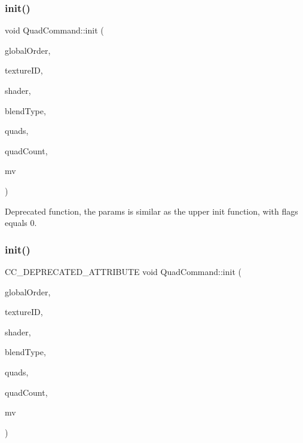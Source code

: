 \subsubsection{\texorpdfstring{init()}{init()}\hspace{0.1cm}{\footnotesize\ttfamily [3/4]}}
{\footnotesize\ttfamily void Quad\+Command\+::init (\begin{DoxyParamCaption}\item[{float}]{global\+Order,  }\item[{G\+Luint}]{texture\+ID,  }\item[{\hyperlink{classGLProgramState}{G\+L\+Program\+State} $\ast$}]{shader,  }\item[{const \hyperlink{structBlendFunc}{Blend\+Func} \&}]{blend\+Type,  }\item[{\hyperlink{structV3F__C4B__T2F__Quad}{V3\+F\+\_\+\+C4\+B\+\_\+\+T2\+F\+\_\+\+Quad} $\ast$}]{quads,  }\item[{ssize\+\_\+t}]{quad\+Count,  }\item[{const \hyperlink{classMat4}{Mat4} \&}]{mv }\end{DoxyParamCaption})}

Deprecated function, the params is similar as the upper init function, with flags equals 0. \mbox{\label{classQuadCommand_a19f82b13c6e8207dfaf04804f085ec43}} 
\subsubsection{\texorpdfstring{init()}{init()}\hspace{0.1cm}{\footnotesize\ttfamily [4/4]}}
{\footnotesize\ttfamily C\+C\+\_\+\+D\+E\+P\+R\+E\+C\+A\+T\+E\+D\+\_\+\+A\+T\+T\+R\+I\+B\+U\+TE void Quad\+Command\+::init (\begin{DoxyParamCaption}\item[{float}]{global\+Order,  }\item[{G\+Luint}]{texture\+ID,  }\item[{\hyperlink{classGLProgramState}{G\+L\+Program\+State} $\ast$}]{shader,  }\item[{const \hyperlink{structBlendFunc}{Blend\+Func} \&}]{blend\+Type,  }\item[{\hyperlink{structV3F__C4B__T2F__Quad}{V3\+F\+\_\+\+C4\+B\+\_\+\+T2\+F\+\_\+\+Quad} $\ast$}]{quads,  }\item[{ssize\+\_\+t}]{quad\+Count,  }\item[{const \hyperlink{classMat4}{Mat4} \&}]{mv }\end{DoxyParamCaption})}

